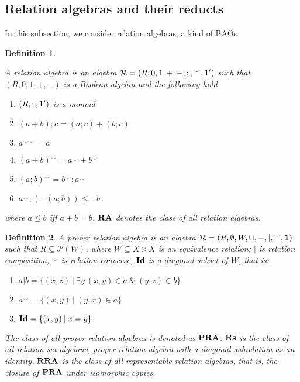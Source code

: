 \documentclass[a4paper]{article}
\theoremstyle{defin}
\newtheorem{definition}{Definition}
\theoremstyle{theorem}
\theoremstyle{claim}
\theoremstyle{prop}
\theoremstyle{lemma}
\theoremstyle{fact}
\theoremstyle{ex}
\theoremstyle{col}
\begin{document}
\subsection{Relation algebras and their reducts}

In this subsection, we consider relation algebras, a kind of BAOs.

\begin{definition}
  $ $

    A relation algebra is an algebra $\mathcal{R} = (R, 0, 1, +, -, ;, {}^{\smile}, {\bf 1'})$ such that $(R, 0, 1, +, -)$ is a Boolean algebra and the following hold:
    \begin{enumerate}
      \item $(R, ;, {\bf 1'})$ is a monoid
      \item $(a + b) ; c = (a ; c) + (b ; c)$
      \item $a^{\smile \smile} = a$
      \item $(a + b)^{\smile} = a^{\smile} + b^{\smile}$
      \item $(a ; b)^{\smile} = b^{\smile} ; a^{\smile}$
      \item $a^{\smile} ; (- (a ; b)) \leq - b$
    \end{enumerate}
    where $a \leq b$ iff $a + b = b$. ${\bf RA}$ denotes the class of all relation algebras.
\end{definition}

\begin{definition}
    A proper relation algebra is an algebra $\mathcal{R} = (R, \emptyset,W, \cup, -, |, {}^{\smile}, {\bf 1 })$ such that $R \subseteq \mathcal{P}(W)$, where $W \subseteq X \times X$ is an equivalence relation; $|$ is relation composition, ${}^{\smile}$ is relation converse, ${\bf Id}$ is a
    diagonal subset of $W$, that is:
    \begin{enumerate}
    \item $a | b = \{ (x, z) \: | \: \exists y \: (x, y) \in a \: \& \: (y, z) \in b \}$
    \item $a^{\smile} = \{ (x, y) \: | \: (y, x) \in a \}$
    \item ${\bf Id} = \{ (x, y) \: | \: x = y \}$
    \end{enumerate}
      The class of all proper relation algebras is denoted as ${\bf PRA}$. ${\bf Rs}$ is the class of all relation set algebras, proper relation algebra with a diagonal subrelation as an identity. ${\bf RRA}$ is the class of all representable relation algebras, that is, the closure of ${\bf PRA}$ under isomorphic copies.
\end{definition}
\end{document}
